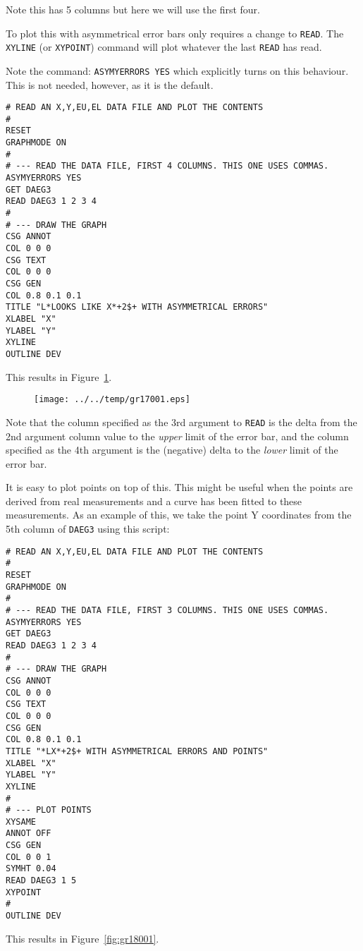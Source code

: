 \documentclass[a4paper,twoside,11pt]{article}
\makeatletter
\def\maxwidth{%
  \ifdim\Gin@nat@width>\linewidth
    \linewidth
  \else
    \Gin@nat@width
  \fi
}
\newcommand{\newpara}{\par\vspace{4mm}\noindent}
\makeatother
\begin{document}
\newpara
Note this has 5 columns but here we will use the first four.
\newpara
To plot this with asymmetrical error bars only requires a change to
\texttt{READ}. The \texttt{XYLINE} (or \texttt{XYPOINT}) command will
plot whatever the last \texttt{READ} has read.
\newpara
Note the command: \texttt{ASYMYERRORS\ YES} which explicitly turns on
this behaviour. This is not needed, however, as it is the default.

\begin{lstlisting}
# READ AN X,Y,EU,EL DATA FILE AND PLOT THE CONTENTS
#
RESET
GRAPHMODE ON
#
# --- READ THE DATA FILE, FIRST 4 COLUMNS. THIS ONE USES COMMAS.
ASYMYERRORS YES
GET DAEG3
READ DAEG3 1 2 3 4
#
# --- DRAW THE GRAPH
CSG ANNOT
COL 0 0 0
CSG TEXT
COL 0 0 0
CSG GEN
COL 0.8 0.1 0.1
TITLE "L*LOOKS LIKE X*+2$+ WITH ASYMMETRICAL ERRORS"
XLABEL "X"
YLABEL "Y"
XYLINE
OUTLINE DEV
\end{lstlisting}

\newpara
This results in Figure~\ref{fig:gr17001}.

\begin{figure}
  \centering
  \texttt{[image: ../../temp/gr17001.eps]}
  \caption{}
  \label{fig:gr17001}
\end{figure}

\newpara
Note that the column specified as the 3rd argument to \texttt{READ} is
the delta from the 2nd argument column value to the \emph{upper} limit
of the error bar, and the column specified as the 4th argument is the
(negative) delta to the \emph{lower} limit of the error bar.

\newpara
It is easy to plot points on top of this. This might be useful when the
points are derived from real measurements and a curve has been fitted to
these measurements. As an example of this, we take the point Y
coordinates from the 5th column of \texttt{DAEG3} using this script:

\begin{lstlisting}
# READ AN X,Y,EU,EL DATA FILE AND PLOT THE CONTENTS
#
RESET
GRAPHMODE ON
#
# --- READ THE DATA FILE, FIRST 3 COLUMNS. THIS ONE USES COMMAS.
ASYMYERRORS YES
GET DAEG3
READ DAEG3 1 2 3 4
#
# --- DRAW THE GRAPH
CSG ANNOT
COL 0 0 0
CSG TEXT
COL 0 0 0
CSG GEN
COL 0.8 0.1 0.1
TITLE "*LX*+2$+ WITH ASYMMETRICAL ERRORS AND POINTS"
XLABEL "X"
YLABEL "Y"
XYLINE
#
# --- PLOT POINTS
XYSAME
ANNOT OFF
CSG GEN
COL 0 0 1
SYMHT 0.04
READ DAEG3 1 5
XYPOINT
#
OUTLINE DEV
\end{lstlisting}

\newpara
This results in Figure~\ref{fig:gr18001}.
\end{document}
